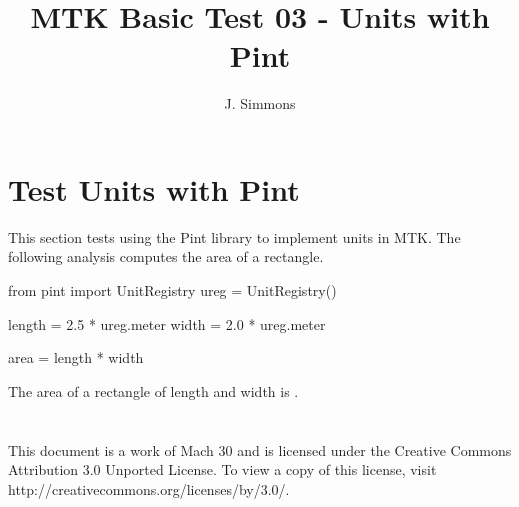 \documentclass{article}
\title{MTK Basic Test 03 - Units with Pint}
\author{J. Simmons}
\begin{document}
\maketitle

\section{Test Units with Pint}
This section tests using the Pint library to implement units in MTK.  The following analysis computes the area of a rectangle.

\begin{sageblock}
from pint import UnitRegistry
ureg = UnitRegistry()

length = 2.5 * ureg.meter
width = 2.0 * ureg.meter

area = length * width
\end{sageblock}

The area of a rectangle of length  and width  is .

\section*{}
This document is a work of Mach 30 and is licensed under the Creative Commons Attribution 3.0 Unported License. To view a copy of this license, visit http://creativecommons.org/licenses/by/3.0/.
\end{document}

